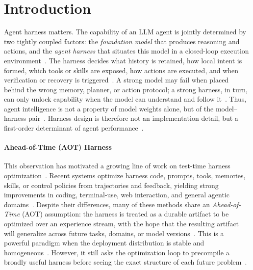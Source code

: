 \documentclass{article}
\begin{document}
\vspace{-0.5em}
\section{Introduction}
\vspace{-0.5em}

\label{sec:introduction}
{Agent harness matters.}
The capability of an LLM agent is jointly determined by two tightly coupled factors: the \textit{foundation model} that produces reasoning and actions, and the \textit{agent harness} that situates this model in a closed-loop execution environment~\citep{meng2026agent,zhou2026externalizationllmagentsunified,ning2026code}.
The harness decides what history is retained, how local intent is formed, which tools or skills are exposed, how actions are executed, and when verification or recovery is triggered~\citep{meng2026agent,zhou2026externalizationllmagentsunified}.
A strong model may fail when placed behind the wrong memory, planner, or action protocol; a strong harness, in turn, can only unlock capability when the model can understand and follow it~\citep{lee2026metaharnessendtoendoptimizationmodel,lin2026agenticharnessengineeringobservabilitydriven}.
Thus, agent intelligence is not a property of model weights alone, but of the model--harness pair~\citep{lee2026metaharnessendtoendoptimizationmodel,zhou2026externalizationllmagentsunified}.
Harness design is therefore not an implementation detail, but a first-order determinant of agent performance~\citep{meng2026agent,lin2026agenticharnessengineeringobservabilitydriven}.

\vspace{-0.5em}
\paragraph{Ahead-of-Time (AOT) Harness} This observation has motivated a growing line of work on test-time harness optimization~\citep{lee2026metaharnessendtoendoptimizationmodel,lin2026agenticharnessengineeringobservabilitydriven}.
Recent systems optimize harness code, prompts, tools, memories, skills, or control policies from trajectories and feedback, yielding strong improvements in coding, terminal-use, web interaction, and general agentic domains~\citep{lee2026metaharnessendtoendoptimizationmodel,lin2026agenticharnessengineeringobservabilitydriven}.
Despite their differences, many of these methods share an \textit{Ahead-of-Time} (AOT) assumption: the harness is treated as a durable artifact to be optimized over an experience stream, with the hope that the resulting artifact will generalize across future tasks, domains, or model versions~\citep{lee2026metaharnessendtoendoptimizationmodel,lin2026agenticharnessengineeringobservabilitydriven}.
This is a powerful paradigm when the deployment distribution is stable and homogeneous~\citep{lin2026agenticharnessengineeringobservabilitydriven,zhang2025memevolve}.
However, it still asks the optimization loop to precompile a broadly useful harness before seeing the exact structure of each future problem~\citep{lee2026metaharnessendtoendoptimizationmodel}.
\end{document}

